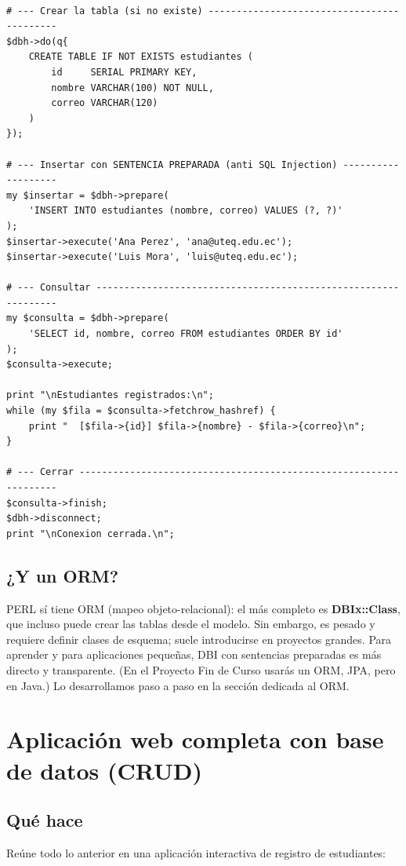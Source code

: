 \documentclass[11pt]{article}
\begin{document}
\begin{cajacodigo}
\begin{lstlisting}[style=perl]

# --- Crear la tabla (si no existe) -------------------------------------------
$dbh->do(q{
    CREATE TABLE IF NOT EXISTS estudiantes (
        id     SERIAL PRIMARY KEY,
        nombre VARCHAR(100) NOT NULL,
        correo VARCHAR(120)
    )
});

# --- Insertar con SENTENCIA PREPARADA (anti SQL Injection) -------------------
my $insertar = $dbh->prepare(
    'INSERT INTO estudiantes (nombre, correo) VALUES (?, ?)'
);
$insertar->execute('Ana Perez', 'ana@uteq.edu.ec');
$insertar->execute('Luis Mora', 'luis@uteq.edu.ec');

# --- Consultar ---------------------------------------------------------------
my $consulta = $dbh->prepare(
    'SELECT id, nombre, correo FROM estudiantes ORDER BY id'
);
$consulta->execute;

print "\nEstudiantes registrados:\n";
while (my $fila = $consulta->fetchrow_hashref) {
    print "  [$fila->{id}] $fila->{nombre} - $fila->{correo}\n";
}

# --- Cerrar ------------------------------------------------------------------
$consulta->finish;
$dbh->disconnect;
print "\nConexion cerrada.\n";
\end{lstlisting}
\end{cajacodigo}
\vspace{2pt}
\subsection{¿Y un ORM?}
PERL sí tiene ORM (mapeo objeto-relacional): el más completo es \textbf{DBIx::Class}, que incluso puede crear las tablas desde el modelo. Sin embargo, es pesado y requiere definir clases de esquema; suele introducirse en proyectos grandes. Para aprender y para aplicaciones pequeñas, DBI con sentencias preparadas es más directo y transparente. (En el Proyecto Fin de Curso usarás un ORM, JPA, pero en Java.) Lo desarrollamos paso a paso en la sección dedicada al ORM.

\section{Aplicación web completa con base de datos (CRUD)}
\subsection{Qué hace}
Reúne todo lo anterior en una aplicación interactiva de registro de estudiantes:
\end{document}
